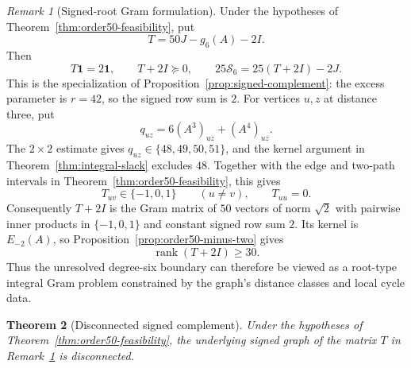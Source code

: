 \documentclass[a4paper,10pt,reqno]{amsart}
\theoremstyle{plain}
\newtheorem{theorem}{Theorem}[section]
\theoremstyle{definition}
\theoremstyle{remark}
\newtheorem{remark}[theorem]{Remark}
\newcommand{\one}{\mathbf 1}
\begin{document}
\begin{remark}[Signed-root Gram formulation]\label{rem:signed-root}
Under the hypotheses of Theorem~\ref{thm:order50-feasibility}, put
\[
 T=50J-g_6(A)-2I.
\]
Then
\[
 T\one=2\one,\qquad T+2I\succeq0,
 \qquad 25\mathcal S_6=25(T+2I)-2J.
\]
This is the specialization of Proposition~\ref{prop:signed-complement}:
the excess parameter is \(r=42\), so the signed row sum is \(2\).
For vertices \(u,z\) at distance three, put
\[
 q_{uz}=6(A^3)_{uz}+(A^4)_{uz}.
\]
The \(2\times2\) estimate gives \(q_{uz}\in\{48,49,50,51\}\), and the kernel
argument in Theorem~\ref{thm:integral-slack} excludes \(48\).  Together with
the edge and two-path intervals in Theorem~\ref{thm:order50-feasibility}, this
gives
\[
 T_{uv}\in\{-1,0,1\}\qquad(u\ne v),\qquad T_{uu}=0.
\]
 Consequently \(T+2I\) is the Gram matrix of \(50\) vectors of norm
 \(\sqrt2\) with pairwise inner products in \(\{-1,0,1\}\) and constant signed
 row sum \(2\).  Its kernel is \(E_{-2}(A)\), so
 Proposition~\ref{prop:order50-minus-two} gives
 \[
  \operatorname{rank}(T+2I)\ge30.
 \]
 Thus the unresolved degree-six boundary can therefore be viewed as a
 root-type integral Gram problem constrained by the graph's distance classes
 and local cycle data.
\end{remark}

\begin{theorem}[Disconnected signed complement]\label{thm:order50-disconnected}
Under the hypotheses of Theorem~\ref{thm:order50-feasibility}, the underlying
signed graph of the matrix \(T\) in Remark~\ref{rem:signed-root} is
disconnected.
\end{theorem}
\end{document}
